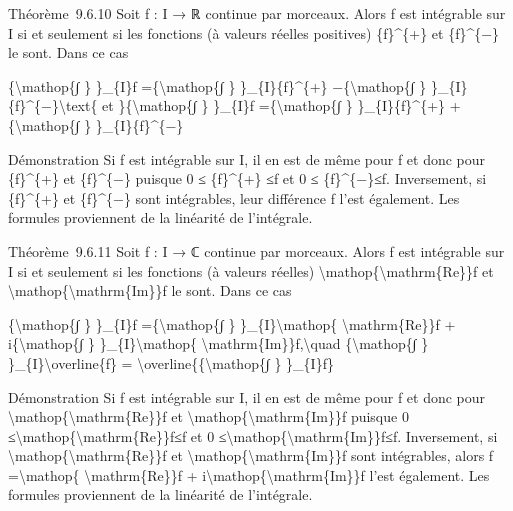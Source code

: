 \documentclass[]{article}
\begin{document}
Théorème~9.6.10 Soit f : I → ℝ continue par morceaux. Alors f est
intégrable sur I si et seulement si les fonctions (à valeurs réelles
positives) \{f\}\^{}\{+\} et \{f\}\^{}\{−\} le sont. Dans ce cas

\{\textbackslash{}mathop\{∫ \} \}\_\{I\}f =\{\textbackslash{}mathop\{∫
\} \}\_\{I\}\{f\}\^{}\{+\} −\{\textbackslash{}mathop\{∫ \}
\}\_\{I\}\{f\}\^{}\{−\}\textbackslash{}text\{ et
\}\{\textbackslash{}mathop\{∫ \} \}\_\{I\}\textbar{}f\textbar{}
=\{\textbackslash{}mathop\{∫ \} \}\_\{I\}\{f\}\^{}\{+\}
+\{\textbackslash{}mathop\{∫ \} \}\_\{I\}\{f\}\^{}\{−\}

Démonstration Si f est intégrable sur I, il en est de même pour
\textbar{}f\textbar{} et donc pour \{f\}\^{}\{+\} et \{f\}\^{}\{−\}
puisque 0 ≤ \{f\}\^{}\{+\} ≤\textbar{}f\textbar{} et 0 ≤
\{f\}\^{}\{−\}≤\textbar{}f\textbar{}. Inversement, si \{f\}\^{}\{+\} et
\{f\}\^{}\{−\} sont intégrables, leur différence f l'est également. Les
formules proviennent de la linéarité de l'intégrale.

Théorème~9.6.11 Soit f : I → ℂ continue par morceaux. Alors f est
intégrable sur I si et seulement si les fonctions (à valeurs réelles)
\textbackslash{}mathop\{\textbackslash{}mathrm\{Re\}\}f et
\textbackslash{}mathop\{\textbackslash{}mathrm\{Im\}\}f le sont. Dans ce
cas

\{\textbackslash{}mathop\{∫ \} \}\_\{I\}f =\{\textbackslash{}mathop\{∫
\} \}\_\{I\}\textbackslash{}mathop\{ \textbackslash{}mathrm\{Re\}\}f +
i\{\textbackslash{}mathop\{∫ \} \}\_\{I\}\textbackslash{}mathop\{
\textbackslash{}mathrm\{Im\}\}f,\textbackslash{}quad
\{\textbackslash{}mathop\{∫ \} \}\_\{I\}\textbackslash{}overline\{f\} =
\textbackslash{}overline\{\{\textbackslash{}mathop\{∫ \} \}\_\{I\}f\}

Démonstration Si f est intégrable sur I, il en est de même pour
\textbar{}f\textbar{} et donc pour
\textbackslash{}mathop\{\textbackslash{}mathrm\{Re\}\}f et
\textbackslash{}mathop\{\textbackslash{}mathrm\{Im\}\}f puisque 0
≤\textbar{}\textbackslash{}mathop\{\textbackslash{}mathrm\{Re\}\}f\textbar{}≤\textbar{}f\textbar{}
et 0
≤\textbar{}\textbackslash{}mathop\{\textbackslash{}mathrm\{Im\}\}f\textbar{}≤\textbar{}f\textbar{}.
Inversement, si \textbackslash{}mathop\{\textbackslash{}mathrm\{Re\}\}f
et \textbackslash{}mathop\{\textbackslash{}mathrm\{Im\}\}f sont
intégrables, alors f =\textbackslash{}mathop\{
\textbackslash{}mathrm\{Re\}\}f +
i\textbackslash{}mathop\{\textbackslash{}mathrm\{Im\}\}f l'est
également. Les formules proviennent de la linéarité de l'intégrale.
\end{document}
